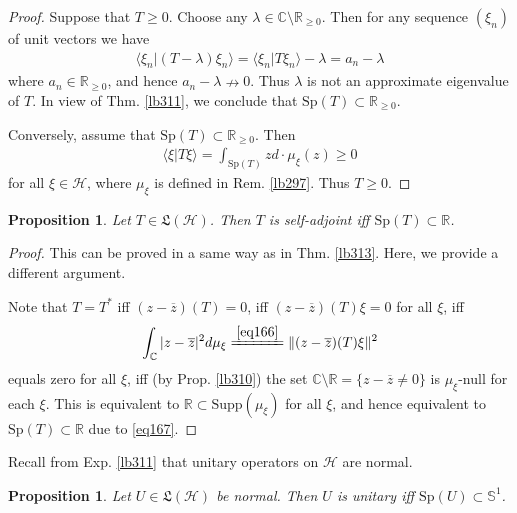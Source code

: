 \documentclass[12pt,b5paper,notitlepage]{article}
\theoremstyle{definition}
\theoremstyle{plain}
\newtheorem{pp}[df]{Proposition}
\newcommand{\fk}{\mathfrak}
\newcommand{\ovl}{\overline}
\newcommand{\bk}[1]{\langle {#1}\rangle}
\newcommand{\Cbb}{\mathbb C}
\newcommand{\Rbb}{\mathbb R}
\newcommand{\Sp}{\mathrm{Sp}}
\newcommand{\Sbb}{{\mathbb S}}
\newcommand{\Supp}{\mathrm{Supp}}
\newcommand{\MH}{\mathcal H}
\numberwithin{equation}{section}
\begin{document}
\begin{proof}
Suppose that $T\geq0$. Choose any $\lambda\in\Cbb\setminus\Rbb_{\geq0}$. Then for any sequence $(\xi_n)$ of unit vectors we have
\begin{align*}
\bk{\xi_n|(T-\lambda)\xi_n}=\bk{\xi_n|T\xi_n}-\lambda=a_n-\lambda
\end{align*}
where $a_n\in\Rbb_{\geq0}$, and hence $a_n-\lambda\nrightarrow0$. Thus $\lambda$ is not an approximate eigenvalue of $T$. In view of Thm. \ref{lb311}, we conclude that $\Sp(T)\subset\Rbb_{\geq0}$.

Conversely, assume that $\Sp(T)\subset\Rbb_{\geq0}$. Then
\begin{align*}
\bk{\xi|T\xi}=\int_{\Sp(T)}z d\cdot\mu_\xi(z)\geq0
\end{align*}
for all $\xi\in\MH$, where $\mu_\xi$ is defined in Rem. \ref{lb297}. Thus $T\geq0$. 
\end{proof}



\begin{pp}\label{lb440}
Let $T\in\fk L(\MH)$. Then $T$ is self-adjoint iff $\Sp(T)\subset\Rbb$.
\end{pp}

\begin{proof}
This can be proved in a same way as in Thm. \ref{lb313}. Here, we provide a different argument.

Note that $T=T^*$ iff $(z-\ovl z)(T)=0$, iff $(z-\ovl z)(T)\xi=0$ for all $\xi$, iff
\begin{align*}
\int_\Cbb |z-\ovl z|^2d\mu_\xi\xlongequal{\eqref{eq166}}\Vert(z-\ovl z)(T)\xi\Vert^2
\end{align*}
equals zero for all $\xi$, iff (by Prop. \ref{lb310}) the set $\Cbb\setminus\Rbb=\{z-\ovl z\neq0\}$ is $\mu_\xi$-null for each $\xi$. This is equivalent to $\Rbb\subset\Supp(\mu_\xi)$ for all $\xi$, and hence equivalent to $\Sp(T)\subset\Rbb$ due to \eqref{eq167}.
\end{proof}



Recall from Exp. \ref{lb311} that unitary operators on $\MH$ are normal.

\begin{pp}\label{lb315}
Let $U\in\fk L(\MH)$ be normal. Then $U$ is unitary iff $\Sp(U)\subset\Sbb^1$.
\end{pp}
\end{document}
